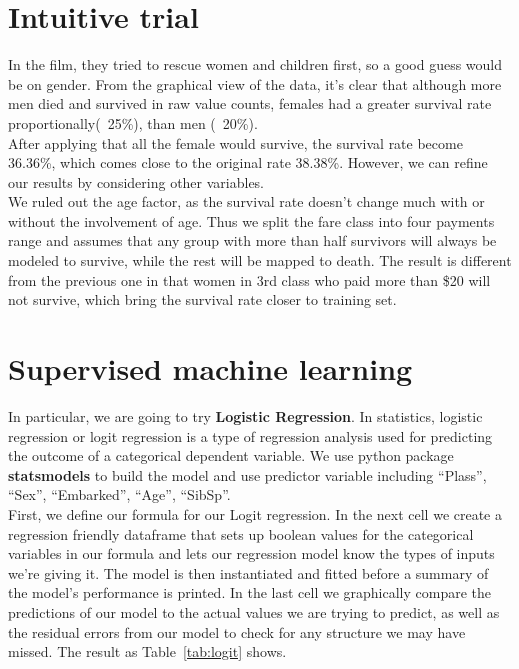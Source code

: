 \documentclass{article}
\begin{document}
\section{Intuitive trial}


In the film, they tried to rescue women and children first, so a good guess would be on gender. From the graphical view of the data, it’s clear that although more men died and survived in raw value counts, females had a greater survival rate proportionally(~25\%), than men (~20\%).\\

After applying that all the female would survive, the survival rate become 36.36\%, which comes close to the original rate 38.38\%. However, we can refine our results by considering other variables.\\

We ruled out the age factor, as the survival rate doesn't change much with or without the involvement of age. Thus we split the fare class into four payments range and assumes that any group with more than half survivors will always be modeled to survive, while the rest will be mapped to death. The result is different from the previous one in that women in 3rd class who paid more than \$20 will not survive, which bring the survival rate closer to training set.



\section{Supervised machine learning}

In particular, we are going to try \textbf{Logistic Regression}. In statistics, logistic regression or logit regression is a type of regression analysis used for predicting the outcome of a categorical dependent variable. We use python package \textbf{statsmodels} to build the model and use predictor variable including ``Plass'', ``Sex'', ``Embarked'', ``Age'', ``SibSp''. \\

First, we define our formula for our Logit regression. In the next cell we create a regression friendly dataframe that sets up boolean values for the categorical variables in our formula and lets our regression model know the types of inputs we're giving it. The model is then instantiated and fitted before a summary of the model's performance is printed. In the last cell we graphically compare the predictions of our model to the actual values we are trying to predict, as well as the residual errors from our model to check for any structure we may have missed. The result as Table~\ref{tab:logit} shows.
\end{document}

